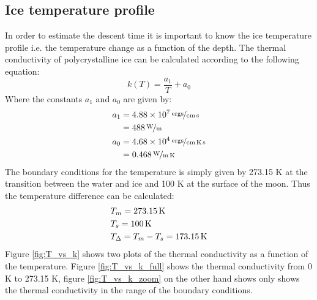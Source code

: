 \subsection{Ice temperature profile}

%

In order to estimate the descent time it is important to know the ice temperature profile i.e. the temperature change as a function of the depth. The thermal conductivity of polycrystalline ice can be calculated according to the following equation\cite[(2.3)]{article:thermalConductivity}:
\begin{equation}
	k(T) = \frac{a_1}{T} + a_0
\end{equation}
Where the constants $a_1$ and $a_0$ are given by:
\begin{align}
	a_1 &= \unitfrac[4.88 \e7]{ergs}{cm \, s} \\ \nonumber
		&= \unitfrac[488]{W}{m} \\
	a_0 &= \unitfrac[4.68 \e4]{ergs}{cm \, K \, s} \\ \nonumber
		&= \unitfrac[0.468]{W}{m \, K}
\end{align}
The boundary conditions for the temperature is simply given by 273.15 K at the transition between the water and ice and 100 K at the surface of the moon\cite{article:thermalConductivity}. Thus the temperature difference can be calculated:
\begin{align}
	& T_m = \unit[273.15]{K} \\
	& T_s = \unit[100]{K} \\
	& T_\Delta = T_m - T_s = \unit[173.15]{K}
\end{align}
Figure \ref{fig:T_vs_k} shows two plots of the thermal conductivity as a function of the temperature. Figure \ref{fig:T_vs_k_full} shows the thermal conductivity from 0 K to 273.15 K, figure \ref{fig:T_vs_k_zoom} on the other hand shows only shows the thermal conductivity in the range of the boundary conditions.

